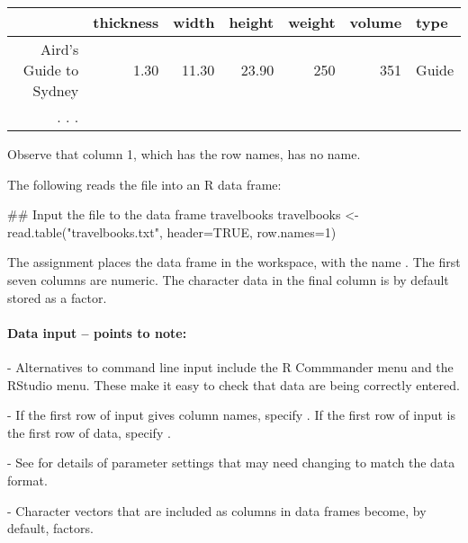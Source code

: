 \noindent
{
\begin{tabular}{rrrrrrl}
\hline
 & thickness & width & height & weight & volume & type \\
\hline
Aird's Guide to Sydney & 1.30 & 11.30 & 23.90       & 250 &  351 &    Guide \\
. . .
\end{tabular}
}
\vspace*{3pt}

\noindent Observe that column 1, which has the row names, has no name.

The following reads the file into an R data frame:
\begin{Schunk}
\begin{Sinput}
## Input the file to the data frame travelbooks
travelbooks <- read.table("travelbooks.txt",
                          header=TRUE, row.names=1)
\end{Sinput}
\end{Schunk}
The assignment places the data frame in the workspace, with the name
.  The first seven columns are numeric.  The
character data in the final column is by default stored as a factor.

\paragraph{Data input -- points to note:}

\begin{itemizz}
\item [-] Alternatives to command line input include the
  R Commmander menu and the RStudio menu.  These make it
  easy to check that data are being correctly entered.
\item[-] If the first row of input gives column names, specify
  .  If the first row of input is the first row of
  data, specify .
\item[-] See  for details of parameter
  settings that may need changing to match the data format.
\item[-] Character vectors that are included as columns in data frames
  become, by default, factors.  
\end{itemizz}


